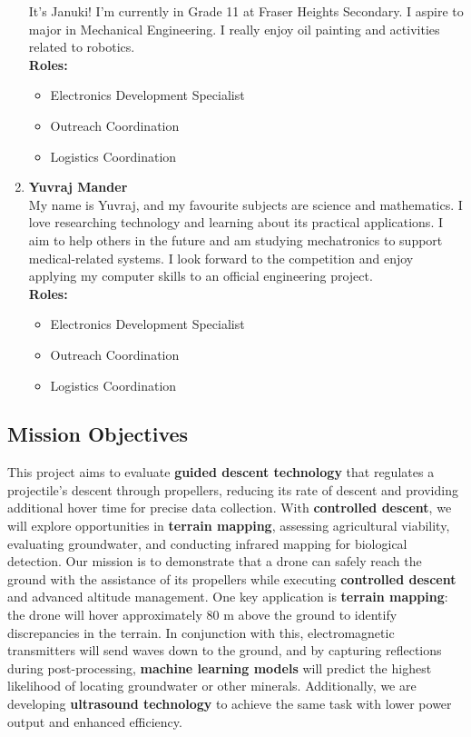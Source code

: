\documentclass{article}
\begin{document}
\begin{enumerate}
    It’s Januki! I’m currently in Grade 11 at Fraser Heights Secondary. I aspire to major in Mechanical Engineering. I really enjoy oil painting and activities related to robotics.\\[1ex]
    \textbf{Roles:}
    \begin{itemize}
        \item Electronics Development Specialist
        \item Outreach Coordination
        \item Logistics Coordination
    \end{itemize}
    \item \textbf{Yuvraj Mander}\\
    My name is Yuvraj, and my favourite subjects are science and mathematics. I love researching technology and learning about its practical applications. I aim to help others in the future and am studying mechatronics to support medical-related systems. I look forward to the competition and enjoy applying my computer skills to an official engineering project.\\[1ex]
    \textbf{Roles:}
    \begin{itemize}
        \item Electronics Development Specialist
        \item Outreach Coordination
        \item Logistics Coordination
    \end{itemize}
\end{enumerate}

\subsection{Mission Objectives}
This project aims to evaluate \textbf{guided descent technology} that regulates a projectile's descent through propellers, reducing its rate of descent and providing additional hover time for precise data collection. With \textbf{controlled descent}, we will explore opportunities in \textbf{terrain mapping}, assessing agricultural viability, evaluating groundwater, and conducting infrared mapping for biological detection. Our mission is to demonstrate that a drone can safely reach the ground with the assistance of its propellers while executing \textbf{controlled descent} and advanced altitude management. One key application is \textbf{terrain mapping}: the drone will hover approximately 80 m above the ground to identify discrepancies in the terrain. In conjunction with this, electromagnetic transmitters will send waves down to the ground, and by capturing reflections during post-processing, \textbf{machine learning models} will predict the highest likelihood of locating groundwater or other minerals. Additionally, we are developing \textbf{ultrasound technology} to achieve the same task with lower power output and enhanced efficiency.
\end{document}
